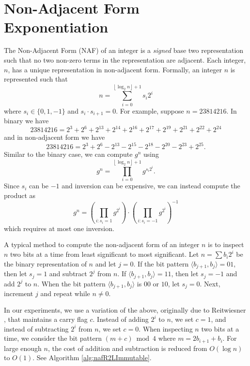 \documentclass{ucalgthes1}
\theoremstyle{plain}
\theoremstyle{definition}
\newcommand{\floor}[1]{\left\lfloor #1 \right\rfloor}
\begin{document}
\bigbreak
\section{Non-Adjacent Form Exponentiation}\label{section:naf}

The Non-Adjacent Form (NAF) of an integer is a \emph{signed} base two representation such that no two non-zero terms in the representation are adjacent. Each integer, $n$, has a unique representation in non-adjacent form. Formally, an integer $n$ is represented such that
\[
	n = \sum_{i=0}^{\floor{\log_2 n}+1} s_i 2^i
\]
where $s_i \in \{0, 1, -1\}$ and $s_i \cdot s_{i+1} = 0$. For example, suppose $n = 23814216$.  In binary we have
\begin{equation}\label{eq:binaryEg}
	23814216 = 2^3+2^6+2^{13}+2^{14}+2^{16}+2^{17}+2^{19}+2^{21}+2^{22}+2^{24}
\end{equation}
and in non-adjacent form we have
\begin{equation}\label{eq:nafEg}
	23814216 = 2^3+2^6-2^{13}-2^{15}-2^{18}-2^{20}-2^{23}+2^{25}.
\end{equation}
Similar to the binary case, we can compute $g^n$ using
\[
	g^n = \prod _{i=0}^{\floor{\log_2 n}+1} g^{s_i 2^i}.
\]
Since $s_i$ can be $-1$ and inversion can be expensive, we can instead compute the product as
\[
	g^n = \left( \prod_{i : s_i=1} g^{2^i} \right) \cdot \left( \prod_{i : s_i=-1} g^{2^i} \right)^{-1}
\]
which requires at most one inversion.

A typical method to compute the non-adjacent form of an integer $n$ is to inspect $n$ two bits at a time from least significant to most significant.  Let $n=\sum b_i2^i$ be the binary representation of $n$ and let $j=0$.  If the bit pattern $\langle b_{j+1}, b_j \rangle = 01$, then let $s_j = 1$ and subtract $2^j$ from $n$.  If $\langle b_{j+1}, b_j \rangle = 11$, then let $s_j = -1$ and add $2^j$ to $n$.  When the bit pattern $\langle b_{j+1}, b_j \rangle$ is $00$ or $10$, let $s_j = 0$. Next, increment $j$ and repeat while $n \ne 0$.

In our experiments, we use a variation of the above, originally due to Reitwiesner \cite{reitwiesner1960}, that maintains a carry flag $c$.  Instead of adding $2^i$ to $n$, we set $c = 1$, and instead of subtracting $2^i$ from $n$, we set $c = 0$.  When inspecting $n$ two bits at a time, we consider the bit pattern $(m+c) \bmod 4$ where $m = 2 b_{i+1} + b_i$.  For large enough $n$, the cost of addition and subtraction is reduced from $O(\log n)$ to $O(1)$.  See Algorithm \ref{alg:nafR2LImmutable}.
\end{document}
